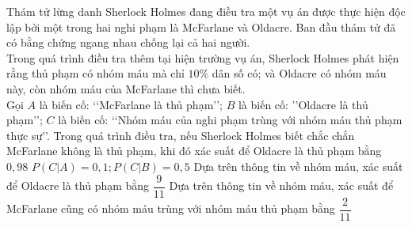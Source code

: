 \begin{ex}
Thám tử lừng danh Sherlock Holmes đang điều tra một vụ án được thực hiện độc lập bởi một trong hai nghi phạm là McFarlane và Oldacre. Ban đầu thám tử đã có bằng chứng ngang nhau chống lại cả hai người.\\
Trong quá trình điều tra thêm tại hiện trường vụ án, Sherlock Holmes phát hiện rằng thủ phạm có nhóm máu mà chỉ $10\%$ dân số có; và Oldacre có nhóm máu này, còn nhóm máu của McFarlane thì chưa biết.\\
Gọi $A$ là biến cố: \lq\lq McFarlane là thủ phạm\rq\rq; $B$ là biến cố: \rq\rq Oldacre là thủ phạm\rq\rq; $C$ là biến cố: \lq\lq Nhóm máu của nghi phạm trùng với nhóm máu thủ phạm thực sự\rq\rq.
\choiceTF
{Trong quá trình điều tra, nếu Sherlock Holmes biết chắc chắn McFarlane không là  thủ phạm, khi đó xác suất để Oldacre là thủ phạm bằng $0{,}98$}
{$P\left(C|A\right)=0{,}1;P\left(C|B\right)=0{,}5$}
{Dựa trên thông tin về nhóm máu, xác suất để Oldacre là thủ phạm bằng $\dfrac{9}{11}$}
{\True Dựa trên thông tin về nhóm máu, xác suất để McFarlane cũng có nhóm máu trùng với nhóm máu thủ phạm bằng $\dfrac{2}{11}$}
\end{ex}
